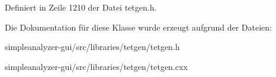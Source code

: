 Definiert in Zeile 1210 der Datei tetgen.\-h.



Die Dokumentation für diese Klasse wurde erzeugt aufgrund der Dateien\-:\begin{DoxyCompactItemize}
\item 
simpleanalyzer-\/gui/src/libraries/tetgen/tetgen.\-h\item 
simpleanalyzer-\/gui/src/libraries/tetgen/tetgen.\-cxx\end{DoxyCompactItemize}
